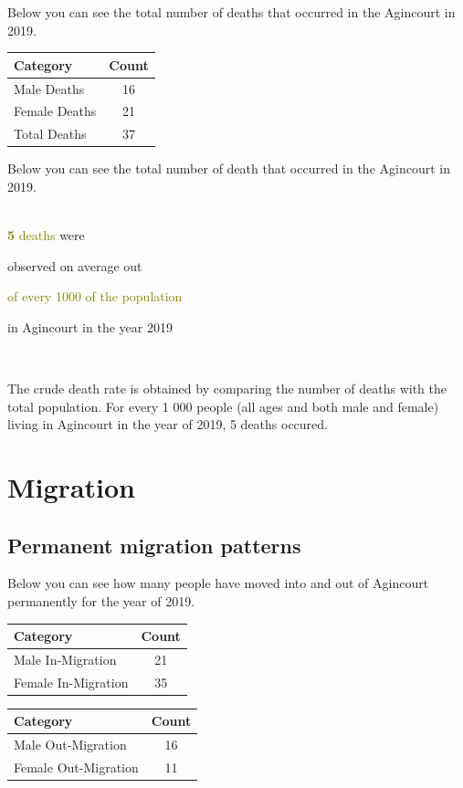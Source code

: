 \documentclass[15,a4paperpaper,]{article}
\begin{document}
Below you can see the total number of deaths that occurred in the
Agincourt in 2019.

\begin{table}[ht]
\centering
\begin{tabularx}{\textwidth}{|l|C|}
   \hline
Category & Count \\ 
  \hline
Male Deaths &  16 \\ 
  Female Deaths &  21 \\ 
  Total Deaths &  37 \\ 
   \hline
\end{tabularx}
\end{table}

Below you can see the total number of death that occurred in the
Agincourt in 2019.

~\\
\begingroup {}\fontsize{70}{70}\selectfont
\textbf{\textcolor{olive}{5}} \endgroup \begingroup
\fontsize{30}{30}\selectfont \textcolor{olive}{deaths} were

observed on average out

\textcolor{olive}{of every 1000 of the population}

in Agincourt in the year 2019 \endgroup

~\\
\hspace*{0.333em}

The crude death rate is obtained by comparing the number of deaths with
the total population. For every 1 000 people (all ages and both male and
female) living in Agincourt in the year of 2019, 5 deaths occured.

\section{Migration}
\subsection{Permanent migration patterns}

Below you can see how many people have moved into and out of Agincourt
permanently for the year of 2019.

\begin{table}[ht]
\centering
\begin{tabularx}{\textwidth}{|l|C|}
   \hline
Category & Count \\ 
  \hline
Male In-Migration &  21 \\ 
  Female In-Migration &  35 \\ 
   \hline
\end{tabularx}
\end{table}

\begin{table}[ht]
\centering
\begin{tabularx}{\textwidth}{|l|C|}
   \hline
Category & Count \\ 
  \hline
Male Out-Migration &  16 \\ 
  Female Out-Migration &  11 \\ 
   \hline
\end{tabularx}
\end{table}
\end{document}
